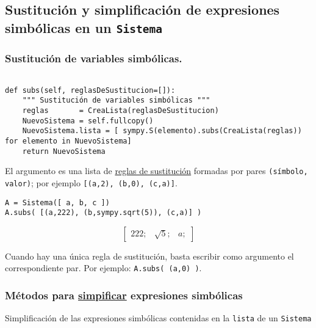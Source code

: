 \documentclass[11pt]{report}
\begin{document}
\subsection{Sustitución y simplificación de expresiones simbólicas en un \texttt{Sistema}}
\label{sec:org0e5274f}

\subsubsection{Sustitución de variables simbólicas.}
\label{sec:org717a76e}

\begin{verbatim}

def subs(self, reglasDeSustitucion=[]):
    """ Sustitución de variables simbólicas """
    reglas       = CreaLista(reglasDeSustitucion)
    NuevoSistema = self.fullcopy()
    NuevoSistema.lista = [ sympy.S(elemento).subs(CreaLista(reglas)) for elemento in NuevoSistema]
    return NuevoSistema

\end{verbatim}

El argumento es una lista de \href{https://docs.sympy.org/latest/tutorials/intro-tutorial/basic\_operations.html}{reglas de sustitución} formadas por pares
\texttt{(símbolo, valor)}; por ejemplo \texttt{[(a,2), (b,0), (c,a)]}.

\begin{verbatim}
A = Sistema([ a, b, c ])
A.subs( [(a,222), (b,sympy.sqrt(5)), (c,a)] )
\end{verbatim}

$$\left[ \begin{array}{ccc}222;& \sqrt{5};& a;\end{array} \right]$$

Cuando hay una única regla de sustitución, basta escribir como
argumento el correspondiente par. Por ejemplo: \texttt{A.subs( (a,0) )}.

\subsubsection{Métodos para \href{https://docs.sympy.org/latest/tutorials/intro-tutorial/simplification.html}{simpificar} expresiones simbólicas}
\label{sec:org7c6b896}

Simplificación de las expresiones simbólicas contenidas en la \texttt{lista} de un \texttt{Sistema}
\end{document}
